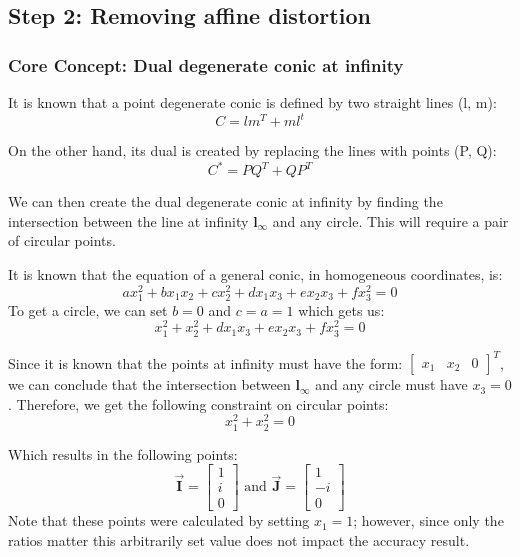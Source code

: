 \documentclass{article}
\begin{document}
\subsection{Step 2: Removing affine distortion}

\subsubsection{Core Concept: Dual degenerate conic at infinity}
It is known that a point degenerate conic is defined by two straight lines (l, m): 
\[C = lm^T + ml^t\]

On the other hand, its dual is created by replacing the lines with points (P, Q):
\[C^* = PQ^T + QP^T\]

We can then create the dual degenerate conic at infinity by finding the intersection between the line at infinity $\boldsymbol{l_\infty}$ and any circle. This will require a pair of circular points.

It is known that the equation of a general conic, in homogeneous coordinates, is:
\[ax_1 ^2 + b x_1 x_2 + c x_2 ^2 + d x_1 x_3 + e x_2 x_3 + fx_3 ^2 = 0\]
To get a circle, we can set $b=0$ and $c=a=1$ which gets us:
\[x_1 ^2 + x_2 ^2 + d x_1 x_3 + e x_2 x_3 + f x_3 ^2 = 0\]

Since it is known that the points at infinity must have the form: \(\begin{bmatrix}
    x_1 & x_2 & 0
\end{bmatrix} ^ T\), we can conclude that the intersection between $\boldsymbol{l_\infty}$ and any circle must have $x_3 = 0$. Therefore, we get the following constraint on circular points: 
\[x_1 ^2 + x_2 ^2 = 0\]

Which results in the following points:
\[\boldsymbol{\Vec{I}} = \begin{bmatrix}
    1 \\ i \\ 0
\end{bmatrix} \text{ and } \boldsymbol{\Vec{J}} = \begin{bmatrix}
    1 \\ -i \\ 0
\end{bmatrix}\]
Note that these points were calculated by setting $x_1 = 1$; however, since only the ratios matter this arbitrarily set value does not impact the accuracy result. 
\end{document}
